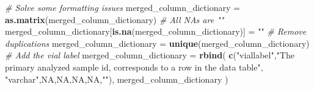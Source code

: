 \documentclass[]{article}
\newenvironment{Shaded}{\begin{snugshade}}{\end{snugshade}}
\newcommand{\KeywordTok}[1]{\textcolor[rgb]{0.13,0.29,0.53}{\textbf{#1}}}
\newcommand{\StringTok}[1]{\textcolor[rgb]{0.31,0.60,0.02}{#1}}
\newcommand{\CommentTok}[1]{\textcolor[rgb]{0.56,0.35,0.01}{\textit{#1}}}
\newcommand{\OtherTok}[1]{\textcolor[rgb]{0.56,0.35,0.01}{#1}}
\newcommand{\NormalTok}[1]{#1}
\begin{document}
\begin{Shaded}
\begin{Highlighting}[]
\CommentTok{# Solve some formatting issues}
\NormalTok{merged_column_dictionary =}\StringTok{ }\KeywordTok{as.matrix}\NormalTok{(merged_column_dictionary)}
\CommentTok{# All NAs are ""}
\NormalTok{merged_column_dictionary[}\KeywordTok{is.na}\NormalTok{(merged_column_dictionary)] =}\StringTok{ ""}
\CommentTok{# Remove duplications}
\NormalTok{merged_column_dictionary =}\StringTok{ }\KeywordTok{unique}\NormalTok{(merged_column_dictionary)}
\CommentTok{# Add the vial label}
\NormalTok{merged_column_dictionary =}\StringTok{ }\KeywordTok{rbind}\NormalTok{(}
  \KeywordTok{c}\NormalTok{(}\StringTok{"viallabel"}\NormalTok{,}\StringTok{"The primary analyzed sample id, corresponds to a row in the data table"}\NormalTok{,}
    \StringTok{"varchar"}\NormalTok{,}\OtherTok{NA}\NormalTok{,}\OtherTok{NA}\NormalTok{,}\OtherTok{NA}\NormalTok{,}\OtherTok{NA}\NormalTok{,}\StringTok{""}\NormalTok{),}
\NormalTok{  merged_column_dictionary}
\NormalTok{)}


\end{Highlighting}
\end{Shaded}
\end{document}
